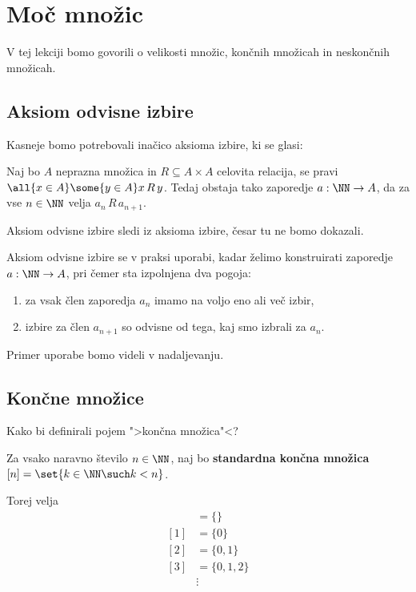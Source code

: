 \chapter{Moč množic}

V tej lekciji bomo govorili o velikosti množic, končnih množicah in neskončnih množicah.

\section{Aksiom odvisne izbire}

Kasneje bomo potrebovali inačico aksioma izbire, ki se glasi:

\begin{aksiom}
  Naj bo $A$ neprazna množica in $R \subseteq A \times A$ celovita relacija, se pravi
  $\all{x \in A} \some{y \in A} x \, R \, y$.
  Tedaj obstaja tako zaporedje $a : \NN \to A$, da za vse $n \in \NN$ velja $a_n \, R \,  a_{n+1}$.
\end{aksiom}

Aksiom odvisne izbire sledi iz aksioma izbire, česar tu ne bomo dokazali.

Aksiom odvisne izbire se v praksi uporabi, kadar želimo konstruirati zaporedje $a : \NN \to A$, pri čemer sta izpolnjena dva pogoja:
%
\begin{enumerate}
\item za vsak člen zaporedja $a_n$ imamo na voljo eno ali več izbir,
\item izbire za člen $a_{n+1}$ so odvisne od tega, kaj smo izbrali za $a_n$.
\end{enumerate}
%
Primer uporabe bomo videli v nadaljevanju.

\section{Končne množice}

Kako bi definirali pojem ">končna množica"<?

\begin{definicija}
  Za vsako naravno število $n \in \NN$, naj bo
  \textbf{standardna končna množica} $[n] = \set{k \in \NN \such k < n}$.
\end{definicija}

\noindent
Torej velja
%
\begin{align*}
  [0] &= \{\} \\
  [1] &= \{0\} \\
  [2] &= \{0, 1\} \\
  [3] &= \{0, 1, 2\} \\
      &\vdots
\end{align*}

